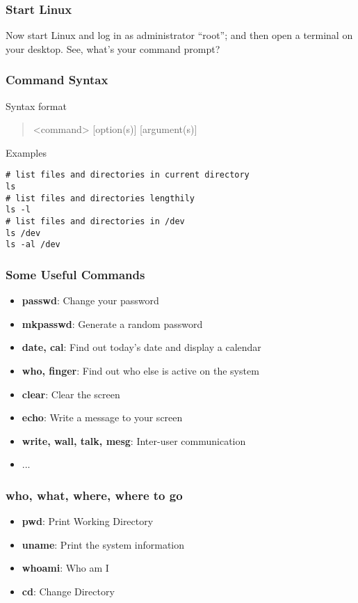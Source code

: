 \documentclass[red]{beamer}
\begin{document}
\begin{CJK*}{GBK}{kai}
\begin{frame}
\frametitle{Start Linux}
\Large Now start Linux and log in as administrator ``root''; and then open a 
	terminal on your desktop. See, what's your command prompt?
\end{frame}

\begin{frame}[t,fragile]
\frametitle{Command Syntax}
\begin{block}{Syntax format}
\begin{quote}
<command> [option(s)] [argument(s)]
\end{quote}
\end{block}

\begin{block}{Examples}
\begin{lstlisting}
# list files and directories in current directory
ls
# list files and directories lengthily
ls -l
# list files and directories in /dev
ls /dev
ls -al /dev
\end{lstlisting}
\end{block}
\end{frame}

\begin{frame}
\frametitle{Some Useful Commands}
\begin{itemize}
    \item \textbf{passwd}: Change your password
    \item \textbf{mkpasswd}: Generate a random password
    \item \textbf{date, cal}: Find out today's date and display a calendar
    \item \textbf{who, finger}: Find out who else is active on the system
    \item \textbf{clear}: Clear the screen
    \item \textbf{echo}: Write a message to your screen
    \item \textbf{write, wall, talk, mesg}: Inter-user communication
    \item ...
\end{itemize}
\end{frame}

\begin{frame}
\frametitle{who, what, where, where to go}
\begin{itemize}
    \item \textbf{pwd}: Print Working Directory
    \item \textbf{uname}: Print the system information
    \item \textbf{whoami}: Who am I
    \item \textbf{cd}: Change Directory
\end{itemize}
\end{frame}


\end{CJK*}
\end{document}
